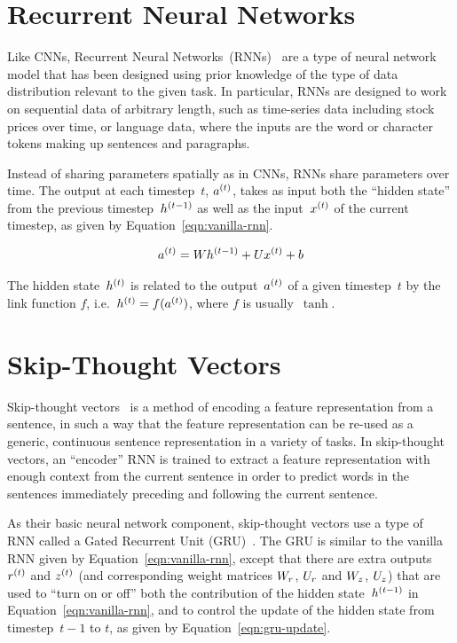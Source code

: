 \section{Recurrent Neural Networks}

Like CNNs, Recurrent Neural Networks~(RNNs)~\cite{rumelhart1986learning} are a
type of neural network model that has been designed using prior knowledge of
the type of data distribution relevant to the given task.
In particular, RNNs are designed to work on sequential data of arbitrary
length, such as time-series data including stock prices over time, or language
data, where the inputs are the word or character tokens making up sentences and
paragraphs.

Instead of sharing parameters spatially as in CNNs, RNNs share parameters over
time. The output at each timestep~$t$, $a^{(t)}$, takes as input both the
``hidden state'' from the previous timestep~$h^{(t - 1)}$ as well as the
input~$x^{(t)}$ of the current timestep, as given by
Equation~\ref{eqn:vanilla-rnn}.

\begin{equation}
        a^{(t)} = Wh^{(t - 1)} + Ux^{(t)} + b
\label{eqn:vanilla-rnn}
\end{equation}

The hidden state~$h^{(t)}$ is related to the output~$a^{(t)}$ of a
given timestep~$t$ by the link function $f$, i.e.\
$h^{(t)} = f(a^{(t)})$, where $f$ is usually~$\tanh$.


\section{Skip-Thought Vectors}

Skip-thought vectors~\cite{kiros2015skip} is a method of encoding a feature
representation from a sentence, in such a way that the feature representation
can be re-used as a generic, continuous sentence representation in a variety of
tasks.
In skip-thought vectors, an ``encoder'' RNN is trained to extract a feature
representation with enough context from the current sentence in order to
predict words in the sentences immediately preceding and following the current
sentence.

As their basic neural network component, skip-thought vectors use a type of RNN
called a Gated Recurrent Unit (GRU)~\cite{cho2014ontheproperties}.
The GRU is similar to the vanilla RNN given by Equation~\ref{eqn:vanilla-rnn},
except that there are extra outputs $r^{(t)}$ and $z^{(t)}$ (and
corresponding weight matrices $W_r$, $U_r$ and $W_z$,
$U_z$) that are used to ``turn on or off'' both the contribution of the
hidden state~$h^{(t - 1)}$ in Equation~\ref{eqn:vanilla-rnn}, and to
control the update of the hidden state from timestep~$t - 1$ to $t$, as given
by Equation~\ref{eqn:gru-update}.

